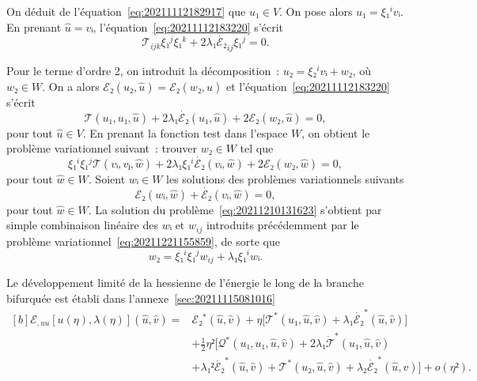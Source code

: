 \documentclass[12pt, final]{amsart}
\begin{document}
On déduit de l'équation~\eqref{eq:20211112182917} que \(u₁∈V\). On pose alors
\(u₁=ξ₁^i vᵢ\). En prenant \(\hat{u}=vᵢ\), l'équation~\eqref{eq:20211112183220}
s'écrit
\begin{equation}
  𝒯_{ijk}ξ₁^jξ₁^k+2λ₁\dot{ℰ₂}_{ij}ξ₁^j=0.
\end{equation}

Pour le terme d'ordre 2, on introduit la décomposition~: \(u₂=ξ₂^ivᵢ+w₂\), où
\(w₂∈W\). On a alors \(ℰ₂(u₂, \hat{u})=ℰ₂(w₂, \hat{u})\) et
l'équation~\eqref{eq:20211112183220} s'écrit
\begin{equation}
  𝒯(u₁, u₁, \hat{u})+2λ₁\dot{ℰ₂}(u₁, \hat{u})
  +2ℰ₂(w₂, \hat{u})=0,
\end{equation}
pour tout \(\hat{u}∈V\). En prenant la fonction test dans l'espace \(W\), on
obtient le problème variationnel suivant~: trouver \(w₂∈W\) tel
que
\begin{equation}
  \label{eq:20211210131623}
  ξ₁^iξ₁^j𝒯(vᵢ, vⱼ, \hat{w})
  +2λ₁ξ₁^i\dot{ℰ₂}(vᵢ, \hat{w})
  +2ℰ₂(w₂, \hat{w})=0,
\end{equation}
pour tout \(\hat{w}∈W\). Soient \(wᵢ∈W\) les solutions des problèmes
variationnels suivants
\begin{equation}
  ℰ₂(wᵢ, \hat{w})+\dot{ℰ₂}(vᵢ, \hat{w})=0,
\end{equation}
pour tout \(\hat{w}∈W\). La solution du problème~\eqref{eq:20211210131623}
s'obtient par simple combinaison linéaire des \(wᵢ\) et \(w_{ij}\) introduits
précédemment par le problème variationnel~\eqref{eq:20211221155859}, de sorte
que
\begin{equation}
  w₂=ξ₁^iξ₁^jw_{ij}+λ₁ξ₁^i wᵢ.
\end{equation}

Le développement limité de la hessienne de l'énergie le long de la branche
bifurquée est établi dans l'annexe~\ref{sec:20211115081016}
\begin{equation}
  \label{eq:20211115082025}
  \begin{aligned}[b]
    ℰ_{,uu}[u(η), λ(η)](\hat{u}, \hat{v})
    ={}&ℰ₂^*(\hat{u}, \hat{v})+η\bigl[𝒯^*(u₁, \hat{u}, \hat{v})
    +λ₁\dot{ℰ₂}^*(\hat{u}, \hat{v})\bigr]\\
    &+\tfrac12η²\bigl[𝒬^*(u₁, u₁, \hat{u}, \hat{v})
    +2λ₁\dot{𝒯}^*(u₁, \hat{u}, \hat{v})\\
    &+λ₁²\ddot{ℰ₂}^*(\hat{u}, \hat{v})+𝒯^*(u₂, \hat{u}, \hat{v})
    +λ₂\dot{ℰ₂}^*(\hat{u}, \hat{v})\bigr]+o(η²).
  \end{aligned}
\end{equation}
\end{document}
